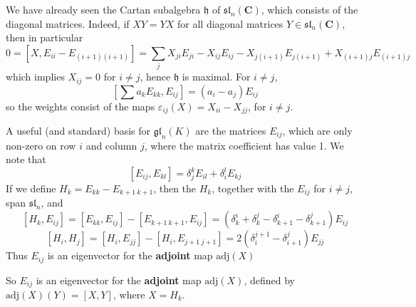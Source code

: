 We have already seen the Cartan subalgebra $\mathfrak{h}$ of $\mathfrak{sl}_n(\mathbf{C})$, which consists of the diagonal matrices. Indeed, if $XY = YX$ for all diagonal matrices $Y \in \mathfrak{sl}_n(\mathbf{C})$, then in particular
%
\[ 0 = [X,E_{ii} - E_{(i+1)(i+1)}] = \sum_j X_{ji} E_{ji} - X_{ij} E_{ij} - X_{j(i+1)} E_{j(i+1)} + X_{(i+1)j} E_{(i+1)j} \]
%
which implies $X_{ij} = 0$ for $i \neq j$, hence $\mathfrak{h}$ is maximal. For $i \neq j$,
%
\[ \left[\sum a_k E_{kk} ,E_{ij} \right] = (a_i - a_j) E_{ij} \]
%
so the weights consist of the maps $\varepsilon_{ij}(X) = X_{ii} - X_{jj}$, for $i \ne j$.

















































A useful (and standard) basis for $\mathfrak{gl}_n(K)$ are the matrices $E_{ij}$, which are only non-zero on row $i$ and column $j$, where the matrix coefficient has value 1. We note that
%
\[ [E_{ij}, E_{kl}] = \delta_j^k E_{il} + \delta_i^l E_{kj} \]
%
If we define $H_k = E_{kk} - E_{k+1\ k+1}$, then the $H_k$, together with the $E_{ij}$ for $i \neq j$, span $\mathfrak{sl}_n$, and
%
\[ [H_k, E_{ij}] = [E_{kk}, E_{ij}] - [E_{k+1\ k+1}, E_{ij}] = (\delta_k^i + \delta_k^j - \delta_{k+1}^i - \delta_{k+1}^j) E_{ij} \]
%
\[ [H_i, H_j] = [H_i, E_{jj}] - [H_i, E_{j+1\ j+1}] = 2(\delta_i^{j+1} - \delta_{i+1}^j) E_{jj} \]
%
Thus $E_{ij}$ is an eigenvector for the {\bf adjoint} map $\text{adj}(X)$

So $E_{ij}$ is an eigenvector for the {\bf adjoint} map $\text{adj}(X)$, defined by $\text{adj}(X)(Y) = [X,Y]$, where $X = H_k$.




















